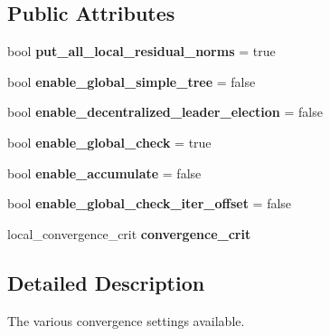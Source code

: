 \subsection*{Public Attributes}
\begin{DoxyCompactItemize}
\item 
\mbox{\label{structSchwarzWrappers_1_1Settings_1_1convergence__settings_a4a352b2bb1afa5db2f13a33e9cf37660}} 
bool {\bfseries put\+\_\+all\+\_\+local\+\_\+residual\+\_\+norms} = true
\item 
\mbox{\label{structSchwarzWrappers_1_1Settings_1_1convergence__settings_ac96d418fa2283a1557362e075c9fe241}} 
bool {\bfseries enable\+\_\+global\+\_\+simple\+\_\+tree} = false
\item 
\mbox{\label{structSchwarzWrappers_1_1Settings_1_1convergence__settings_a49299f5cfc4442fedba5bdc75a474890}} 
bool {\bfseries enable\+\_\+decentralized\+\_\+leader\+\_\+election} = false
\item 
\mbox{\label{structSchwarzWrappers_1_1Settings_1_1convergence__settings_a1c86233d2af7c8c0fa2e34f0b53d18d0}} 
bool {\bfseries enable\+\_\+global\+\_\+check} = true
\item 
\mbox{\label{structSchwarzWrappers_1_1Settings_1_1convergence__settings_a15a8ffa0b521aebc6f0dec647d18b817}} 
bool {\bfseries enable\+\_\+accumulate} = false
\item 
\mbox{\label{structSchwarzWrappers_1_1Settings_1_1convergence__settings_ac44e50bab4019dad6ba20d779e592bf6}} 
bool {\bfseries enable\+\_\+global\+\_\+check\+\_\+iter\+\_\+offset} = false
\item 
local\+\_\+convergence\+\_\+crit {\bfseries convergence\+\_\+crit}
\end{DoxyCompactItemize}


\subsection{Detailed Description}
The various convergence settings available. 

